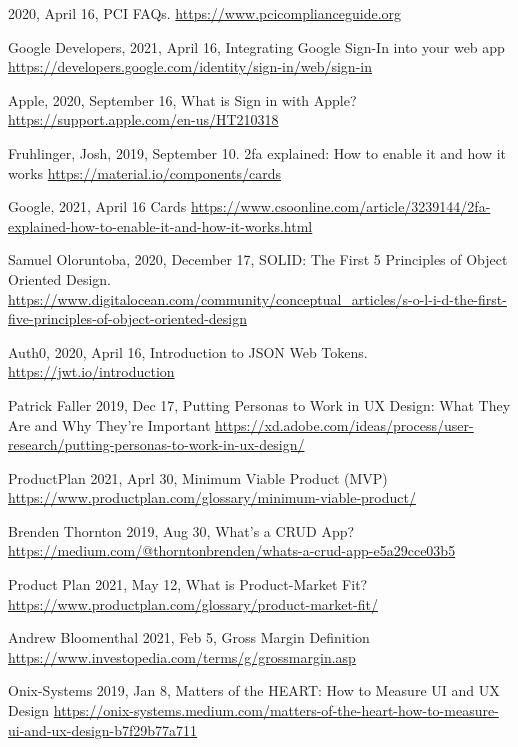 \begin{thebibliography}{9} 
    2020, April 16,
    PCI FAQs.
    \url{https://www.pcicomplianceguide.org}

    Google Developers,
    2021, April 16,
    Integrating Google Sign-In into your web app
    \url{https://developers.google.com/identity/sign-in/web/sign-in}

    Apple,
    2020, September 16,
    What is Sign in with Apple?
    \url{https://support.apple.com/en-us/HT210318}

    Fruhlinger, Josh,
    2019, September 10.
    2fa explained: How to enable it and how it works
    \url{https://material.io/components/cards}

    Google,
    2021, April 16 
    Cards
    \url{https://www.csoonline.com/article/3239144/2fa-explained-how-to-enable-it-and-how-it-works.html}

    Samuel Oloruntoba,
    2020, December 17,
    SOLID: The First 5 Principles of Object Oriented Design.
    \url{https://www.digitalocean.com/community/conceptual_articles/s-o-l-i-d-the-first-five-principles-of-object-oriented-design}

    Auth0,
    2020, April 16,
    Introduction to JSON Web Tokens.
    \url{https://jwt.io/introduction}

    Patrick Faller
    2019, Dec 17,
    Putting Personas to Work in UX Design: What They Are and Why They’re Important
    \url{https://xd.adobe.com/ideas/process/user-research/putting-personas-to-work-in-ux-design/}

    ProductPlan
    2021, Aprl 30,
    Minimum Viable Product (MVP)
    \url{https://www.productplan.com/glossary/minimum-viable-product/}

    Brenden Thornton
    2019, Aug 30,
    What’s a CRUD App?
    \url{https://medium.com/@thorntonbrenden/whats-a-crud-app-e5a29cce03b5}

    Product Plan
    2021, May 12,
    What is Product-Market Fit?
    \url{https://www.productplan.com/glossary/product-market-fit/}

    Andrew Bloomenthal
    2021, Feb 5,
    Gross Margin Definition
    \url{https://www.investopedia.com/terms/g/grossmargin.asp}

    Onix-Systems
    2019, Jan 8,
    Matters of the HEART: How to Measure UI and UX Design
    \url{https://onix-systems.medium.com/matters-of-the-heart-how-to-measure-ui-and-ux-design-b7f29b77a711}
    
\end{thebibliography}
